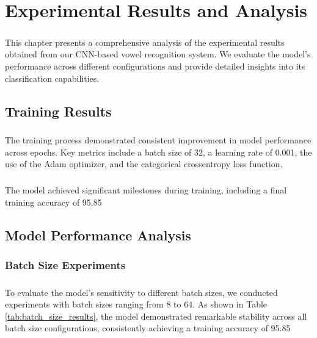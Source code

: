 
\chapter{Experimental Results and Analysis}
\label{chp:results}

\paragraph{}
This chapter presents a comprehensive analysis of the experimental results obtained from our CNN-based vowel recognition system. We evaluate the model's performance across different configurations and provide detailed insights into its classification capabilities.

\section{Training Results}
\label{sec:training-results}

\paragraph{}
The training process demonstrated consistent improvement in model performance across epochs. Key metrics include a batch size of 32, a learning rate of 0.001, the use of the Adam optimizer, and the categorical crossentropy loss function.

\paragraph{}
The model achieved significant milestones during training, including a final training accuracy of 95.85%

\section{Model Performance Analysis}
\label{sec:model-performance}

\subsection{Batch Size Experiments}
\label{subsec:batch-size}

\paragraph{}
To evaluate the model's sensitivity to different batch sizes, we conducted experiments with batch sizes ranging from 8 to 64. As shown in Table \ref{tab:batch_size_results}, the model demonstrated remarkable stability across all batch size configurations, consistently achieving a training accuracy of 95.85%

